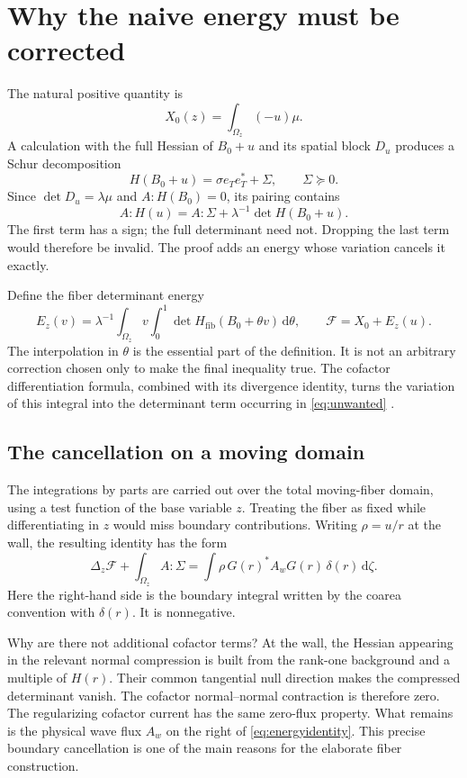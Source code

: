 \documentclass[11pt,a4paper]{article}
\numberwithin{equation}{section}
\theoremstyle{definition}
\theoremstyle{remark}
\newcommand{\dd}{\,\mathrm d}
\begin{document}
\section{Why the naive energy must be corrected}
\label{sec:energy}
The natural positive quantity is
\[
 X_0(z)=\int_{\Omega_z}(-u)\mu.
\]
A calculation with the full Hessian of $B_0+u$ and its spatial block $D_u$
produces a Schur decomposition
\[
 H(B_0+u)=\sigma e_Te_T^*+\Sigma,\qquad \Sigma\succeq0.
\]
Since $\det D_u=\lambda\mu$ and $A:H(B_0)=0$, its pairing contains
\begin{equation}\label{eq:unwanted}
 A:H(u)=A:\Sigma+\lambda^{-1}\det H(B_0+u).
\end{equation}
The first term has a sign; the full determinant need not. Dropping the last
term would therefore be invalid. The proof adds an energy whose variation
cancels it exactly.

Define the fiber determinant energy
\[
 E_z(v)=\lambda^{-1}\int_{\Omega_z}v
       \int_0^1\det H_{\mathrm{fib}}(B_0+\theta v)\dd\theta,
 \qquad \mathcal F=X_0+E_z(u).
\]
The interpolation in $\theta$ is the essential part of the definition. It is
not an arbitrary correction chosen only to make the final inequality true.
The cofactor differentiation formula, combined with its divergence identity,
turns the variation of this integral into the determinant term occurring in
\eqref{eq:unwanted} \cite{energy,calculus}.

\subsection{The cancellation on a moving domain}
The integrations by parts are carried out over the total moving-fiber domain,
using a test function of the base variable $z$. Treating the fiber as fixed
while differentiating in $z$ would miss boundary contributions. Writing
$\rho=u/r$ at the wall, the resulting identity has the form
\begin{equation}\label{eq:energyidentity}
 \Delta_z\mathcal F+\int_{\Omega_z}A:\Sigma
 =\int \rho\,G(r)^*A_wG(r)\,\delta(r)\dd\zeta.
\end{equation}
Here the right-hand side is the boundary integral written by the coarea
convention with $\delta(r)$. It is nonnegative.

Why are there not additional cofactor terms? At the wall, the Hessian appearing
in the relevant normal compression is built from the rank-one background and
a multiple of $H(r)$. Their common tangential null direction makes the
compressed determinant vanish. The cofactor normal--normal contraction is
therefore zero. The regularizing cofactor current has the same zero-flux
property. What remains is the physical wave flux $A_w$ on the right of
\eqref{eq:energyidentity}. This precise boundary cancellation is one of the
main reasons for the elaborate fiber construction.
\end{document}
